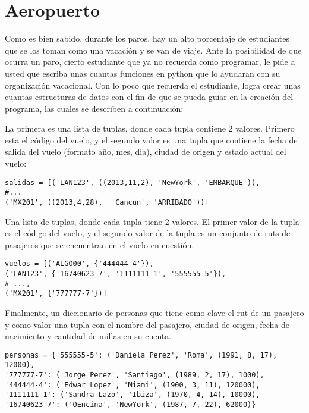 \section{Aeropuerto}

Como es bien sabido, durante los paros, hay un alto porcentaje de estudiantes que se los toman como una vacación y se van de viaje. Ante la posibilidad de que ocurra un paro, cierto estudiante que ya no recuerda como programar, le pide a usted que escriba unas cuantas funciones en python que lo ayudaran con su organización vacacional. Con lo poco que recuerda el estudiante, logra crear unas cuantas estructuras de datos con el fin de que se pueda guiar en la creación del programa, las cuales se describen a continuación:

La primera es una lista de tuplas, donde cada tupla contiene 2 valores. Primero esta el código del vuelo, y el segundo valor es una tupla que contiene la fecha de salida del vuelo (formato año, mes, dia), ciudad de origen y estado actual del vuelo:

\begin{lstlisting}[style=consola]
salidas = [('LAN123', ((2013,11,2), 'NewYork', 'EMBARQUE')),
#...
('MX201', ((2013,4,28),  'Cancun', 'ARRIBADO'))]
\end{lstlisting}

Una lista de tuplas, donde cada tupla tiene 2 valores. El primer valor de la tupla es el código del vuelo, y el segundo valor de la tupla es un conjunto de ruts de pasajeros que se encuentran en el vuelo en cuestión.

\begin{lstlisting}[style=consola]
vuelos = [('ALGO00', {'444444-4'}), 
('LAN123', {'16740623-7', '1111111-1', '555555-5'}), 
# ..., 
('MX201', {'777777-7'})]
\end{lstlisting}

Finalmente, un diccionario de personas que tiene como clave el rut de un pasajero y como valor una tupla con el nombre del pasajero, ciudad de origen, fecha de nacimiento y cantidad de millas en su cuenta.

\begin{lstlisting}[style=consola]
personas = {'555555-5': ('Daniela Perez', 'Roma', (1991, 8, 17), 12000), 
'777777-7': ('Jorge Perez', 'Santiago', (1989, 2, 17), 1000), 
'444444-4': ('Edwar Lopez', 'Miami', (1900, 3, 11), 120000), 
'1111111-1': ('Sandra Lazo', 'Ibiza', (1970, 4, 14), 10000), 
'16740623-7': ('OEncina', 'NewYork', (1987, 7, 22), 62000)}
\end{lstlisting}

